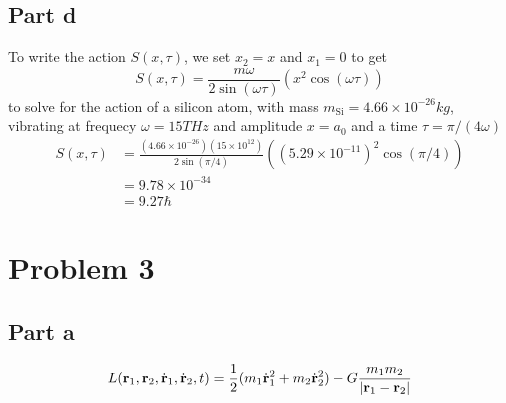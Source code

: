 \documentclass[12pt]{report}
\newcommand{\rb}{\bold{r}}
\begin{document}
\subsection*{Part d}
To write the action $S(x,\tau)$, we set $x_2 = x$ and $x_1 = 0$ to get 
\begin{equation*}
  S(x,\tau) = \frac{m\omega}{2\sin(\omega \tau)}( x^2\cos(\omega \tau))
\end{equation*}
to solve for the action of a silicon atom, with mass $m_{\text{Si}} = 4.66 \times 10^{-26} \si{kg}$, vibrating at frequecy $\omega = 15\si{THz}$ and amplitude $x = a_0$ and a time $\tau = \pi/(4\omega)$
\begin{align*}
    S(x,\tau) &= \frac{(4.66 \times 10^{-26})(15\times 10^{12})}{2\sin(\pi/4)} ((5.29 \times 10^{-11})^2 \cos(\pi/4)) \\
    &= 9.78 \times 10^{-34} \\
    &= 9.27 \hbar
\end{align*}

\section*{Problem 3}
\subsection*{Part a}
\begin{equation*}
    L(\rb_1,\rb_2, \dot{\rb}_1, \dot{\rb}_2,t) = \frac{1}{2}(m_1\dot{\rb}_1^2 + m_2\dot{\rb}_2^2) - G\frac{m_1m_2}{|\rb_1 -\rb_2|}
\end{equation*}
\end{document}
